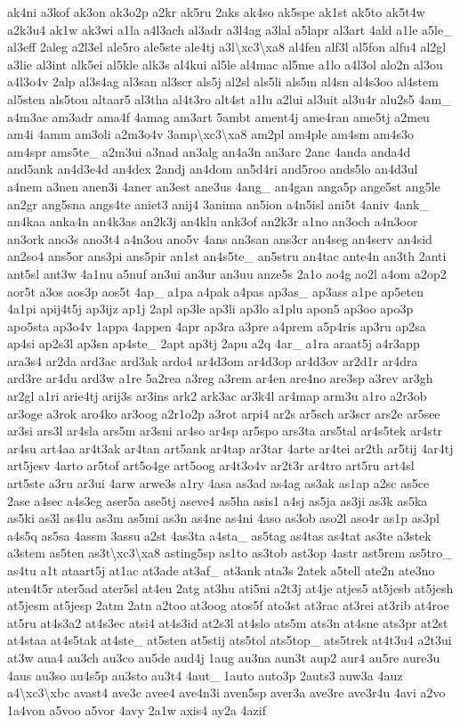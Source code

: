 {ak4ni a3kof ak3on ak3o2p a2kr ak5ru 2aks ak4so ak5spe ak1st ak5to ak5t4w a2k3u4 ak1w ak3wi a1la a4l3ach al3adr a3l4ag a3lal a5lapr al3art 4ald a1le a5le\-\_\- al3eff 2aleg a2l3el ale5ro ale5ste ale4tj a3l\textbackslash{}xc3\textbackslash{}xa8 al4fen alf3l al5fon alfu4 al2gl a3lie al3int alk5ei al5kle alk3s al4kui al5le al4mac al5me a1lo a4l3ol alo2n al3ou a4l3o4v 2alp al3s4ag al3san al3scr als5j al2sl als5li als5m al4sn al4s3oo al4stem al5sten als5tou altaar5 al3tha al4t3ro alt4st a1lu a2lui al3uit al3u4r alu2s5 4am\-\_\- a4m3ac am3adr ama4f 4amag am3art 5ambt ament4j ame4ran ame5tj a2meu am4i 4amm am3oli a2m3o4v 3amp\textbackslash{}xc3\textbackslash{}xa8 am2pl am4ple am4sm am4s3o am4spr ams5te\-\_\- a2m3ui a3nad an3alg an4a3n an3arc 2anc 4anda anda4d and5ank an4d3e4d an4dex 2andj an4dom an5d4ri and5roo ands5lo an4d3ul a4nem a3nen anen3i 4aner an3est ane3us 4ang\-\_\- an4gan anga5p ange5st ang5le an2gr ang5sna angs4te aniet3 anij4 3anima an5ion a4n5isl ani5t 4aniv 4ank\-\_\- an4kaa anka4n an4k3as an2k3j an4klu ank3of an2k3r a1no an3och a4n3oor an3ork ano3s ano3t4 a4n3ou ano5v 4ans an3san ans3cr an4seg an4serv an4sid an2so4 ans5or ans3pi ans5pir an1st an4s5te\-\_\- an5stru an4tac ante4n an3th 2anti ant5sl ant3w 4a1nu a5nuf an3ui an3ur an3uu anze5s 2a1o ao4g ao2l a4om a2op2 aor5t a3os aos3p aos5t 4ap\-\_\- a1pa a4pak a4pas ap3as\-\_\- ap3ass a1pe ap5eten 4a1pi apij4t5j ap3ijz ap1j 2apl ap3le ap3li ap3lo a1plu apon5 ap3oo apo3p apo5sta ap3o4v 1appa 4appen 4apr ap3ra a3pre a4prem a5p4ris ap3ru ap2sa ap4si ap2s3l ap3sn ap4ste\-\_\- 2apt ap3tj 2apu a2q 4ar\-\_\- a1ra araat5j a4r3app ara3s4 ar2da ard3ac ard3ak ardo4 ar4d3om ar4d3op ar4d3ov ar2d1r ar4dra ard3re ar4du ard3w a1re 5a2rea a3reg a3rem ar4en are4no are3sp a3rev ar3gh ar2gl a1ri arie4tj arij3s ar3ins ark2 ark3ac ar3k4l ar4map arm3u a1ro a2r3ob ar3oge a3rok aro4ko ar3oog a2r1o2p a3rot arpi4 ar2s ar5sch ar3scr ars2e ar5see ar3si ars3l ar4sla ars5m ar3sni ar4so ar4sp ar5spo ars3ta ars5tal ar4s5tek ar4str ar4su art4aa ar4t3ak ar4tan art5ank ar4tap ar3tar 4arte ar4tei ar2th ar5tij 4ar4tj art5jesv 4arto ar5tof art5o4ge art5oog ar4t3o4v ar2t3r ar4tro art5ru art4sl art5ste a3ru ar3ui 4arw arwe3s a1ry 4asa as3ad as4ag as3ak as1ap a2sc as5ce 2ase a4sec a4s3eg aser5a ase5tj aseve4 as5ha asis1 a4sj as5ja as3ji as3k as5ka as5ki as3l as4lu as3m as5mi as3n as4ne as4ni 4aso as3ob aso2l aso4r as1p as3pl a4s5q as5sa 4assm 3assu a2st 4as3ta a4sta\-\_\- as5tag as4tas as4tat as3te a3stek a3stem as5ten as3t\textbackslash{}xc3\textbackslash{}xa8 asting5sp as1to as3tob ast3op 4astr ast5rem as5tro\-\_\- as4tu a1t ataart5j at1ac at3ade at3af\-\_\- at3ank ata3s 2atek a5tell ate2n ate3no aten4t5r ater5ad ater5sl at4eu 2atg at3hu ati5ni a2t3j at4je atjes5 at5jesb at5jesh at5jesm at5jesp 2atm 2atn a2too at3oog atos5f ato3st at3rac at3rei at3rib at4roe at5ru at4s3a2 at4s3ec atsi4 at4s3id at2s3l at4slo ats5m ats3n at4sne ats3pr at2st at4staa at4s5tak at4ste\-\_\- at5sten at5stij ats5tol ats5top\-\_\- ats5trek at4t3u4 a2t3ui at3w aua4 au3ch au3co au5de aud4j 1aug au3na aun3t aup2 aur4 au5re aure3u 4aus au3so au4s5p au3sto au3t4 4aut\-\_\- 1auto auto3p 2auts3 auw3a 4auz a4\textbackslash{}xc3\textbackslash{}xbc avast4 ave3c avee4 ave4n3i aven5sp aver3a ave3re ave3r4u 4avi a2vo 1a4von a5voo a5vor 4avy 2a1w axis4 ay2a 4azif }

